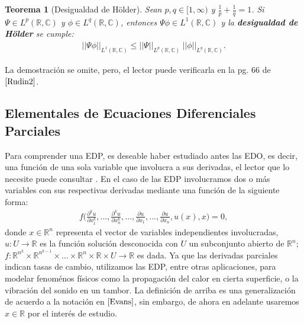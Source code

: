 \documentclass[12pt]{article}
\newtheorem{teo}{Teorema}[section]
\theoremstyle{definition}
\newcommand*{\field}[1]{\mathbb{#1}}
\begin{document}
\begin{teo}[Desigualdad de Hölder]
    Sean $p,q \in [1,\infty)$ y $\frac{1}{p}+\frac{1}{q}=1$. Si $\Psi\in L^{p}(\field{R},\field{C})$ y $\phi\in L^{q}(\field{R},\field{C})$, entonces $\Psi\phi\in L^{1}(\field{R},\field{C})$ y la \textbf{desigualdad de Hölder} se cumple:
    \begin{align*}
        ||\Psi\phi||_{L^{1}(\field{R},\field{C})}\leq
        ||\Psi||_{L^{p}(\field{R},\field{C})}\:||\phi||_{L^{q}(\field{R},\field{C})}.
    \end{align*}
    \label{def:Holder}
\end{teo}
\noindent
La demostración se omite, pero, el lector puede verificarla en la pg. 66 de $\cite{Rudin2}$.

\subsection{Elementales de Ecuaciones Diferenciales Parciales}
\label{ElementalesEDP}
\noindent
Para comprender una EDP, es deseable haber estudiado antes las EDO, es decir, una función de una sola variable que involucra a sus derivadas, el lector que lo necesite puede consultar \cite{Braun}. En el caso de las EDP involucramos dos o más variables con sus respectivas derivadas mediante una función de la siguiente forma:
\begin{align*}
    f\bigg(\frac{\partial ^k u}{\partial x_{1}^{k}},...,\frac{\partial^k u}{\partial x_{n}^{k}},...,\frac{\partial u}{\partial x_{1}},...,
    \frac{\partial u}{\partial x_{n}}
    ,u(x),x\bigg) = 0,
\end{align*}
donde $x\in\field{R}^n$ representa el vector de variables independientes involucradas, $u:U\longrightarrow\field{R}$ es la función solución desconocida con $U$ un subconjunto abierto de $\field{R}^{n}$; $f:\field{R}^{n^{k}}\times\field{R}^{n^{k-1}}\times...\times\field{R}^{n}\times\field{R}\times U\longrightarrow\field{R}$ es dada. Ya que las derivadas parciales indican tasas de cambio, utilizamos las EDP, entre otras aplicaciones, para modelar fenoménos físicos como la propagación del calor en cierta superficie, o la vibración del sonido en un tambor. La definición de arriba es una generalización de acuerdo a la notación en $\cite{Evans}$, sin embargo, de ahora en adelante usaremos $x\in\field{R}$ por el interés de estudio. 
\end{document}
